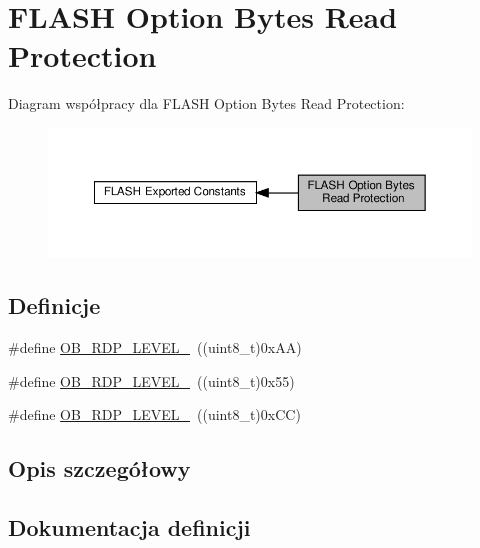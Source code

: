 \hypertarget{group___f_l_a_s_h_ex___option___bytes___read___protection}{}\section{F\+L\+A\+SH Option Bytes Read Protection}
\label{group___f_l_a_s_h_ex___option___bytes___read___protection}
Diagram współpracy dla F\+L\+A\+SH Option Bytes Read Protection\+:\nopagebreak
\begin{figure}[H]
\begin{center}
\leavevmode
\includegraphics[width=350pt]{group___f_l_a_s_h_ex___option___bytes___read___protection}
\end{center}
\end{figure}
\subsection*{Definicje}
\begin{DoxyCompactItemize}
\item 
\#define \hyperlink{group___f_l_a_s_h_ex___option___bytes___read___protection_ga22c7871bda267a2844ab9ca9f7bd38e4}{O\+B\+\_\+\+R\+D\+P\+\_\+\+L\+E\+V\+E\+L\+\_}~((uint8\+\_\+t)0x\+A\+A)
\item 
\#define \hyperlink{group___f_l_a_s_h_ex___option___bytes___read___protection_ga778207f0d12d87bbff9d55e985aba5bc}{O\+B\+\_\+\+R\+D\+P\+\_\+\+L\+E\+V\+E\+L\+\_}~((uint8\+\_\+t)0x55)
\item 
\#define \hyperlink{group___f_l_a_s_h_ex___option___bytes___read___protection_ga2262afca565429ce2808d835c49e5ee6}{O\+B\+\_\+\+R\+D\+P\+\_\+\+L\+E\+V\+E\+L\+\_}~((uint8\+\_\+t)0x\+C\+C)
\end{DoxyCompactItemize}


\subsection{Opis szczegółowy}


\subsection{Dokumentacja definicji}
\mbox{\label{group___f_l_a_s_h_ex___option___bytes___read___protection_ga22c7871bda267a2844ab9ca9f7bd38e4}} 
